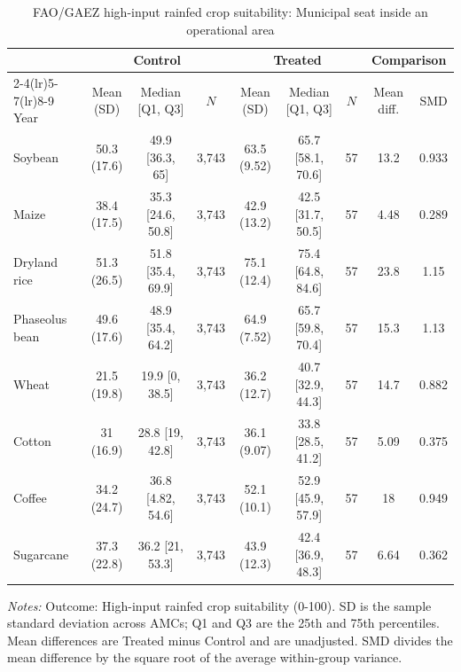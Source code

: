 \begin{table}[!htbp]
\centering
\caption{FAO/GAEZ high-input rainfed crop suitability: Municipal seat inside an operational area}
\label{tab:polocentro_operational_any_seat_inside_gaez_high_input}
\small
\setlength{\tabcolsep}{4pt}
\begin{tabular}{@{}lcccccccc@{}}
\toprule
& \multicolumn{3}{c}{Control} & \multicolumn{3}{c}{Treated} & \multicolumn{2}{c}{Comparison} \\
\cmidrule(lr){2-4}\cmidrule(lr){5-7}\cmidrule(lr){8-9}
Year & Mean (SD) & Median [Q1, Q3] & $N$ & Mean (SD) & Median [Q1, Q3] & $N$ & Mean diff. & SMD \\
\midrule
Soybean & 50.3 (17.6) & 49.9 [36.3, 65] & 3,743 & 63.5 (9.52) & 65.7 [58.1, 70.6] & 57 & 13.2 & 0.933 \\
Maize & 38.4 (17.5) & 35.3 [24.6, 50.8] & 3,743 & 42.9 (13.2) & 42.5 [31.7, 50.5] & 57 & 4.48 & 0.289 \\
Dryland rice & 51.3 (26.5) & 51.8 [35.4, 69.9] & 3,743 & 75.1 (12.4) & 75.4 [64.8, 84.6] & 57 & 23.8 & 1.15 \\
Phaseolus bean & 49.6 (17.6) & 48.9 [35.4, 64.2] & 3,743 & 64.9 (7.52) & 65.7 [59.8, 70.4] & 57 & 15.3 & 1.13 \\
Wheat & 21.5 (19.8) & 19.9 [0, 38.5] & 3,743 & 36.2 (12.7) & 40.7 [32.9, 44.3] & 57 & 14.7 & 0.882 \\
Cotton & 31 (16.9) & 28.8 [19, 42.8] & 3,743 & 36.1 (9.07) & 33.8 [28.5, 41.2] & 57 & 5.09 & 0.375 \\
Coffee & 34.2 (24.7) & 36.8 [4.82, 54.6] & 3,743 & 52.1 (10.1) & 52.9 [45.9, 57.9] & 57 & 18 & 0.949 \\
Sugarcane & 37.3 (22.8) & 36.2 [21, 53.3] & 3,743 & 43.9 (12.3) & 42.4 [36.9, 48.3] & 57 & 6.64 & 0.362 \\
\bottomrule
\end{tabular}
\vspace{2pt}
\begin{minipage}{0.98\linewidth}
\footnotesize \textit{Notes:} Outcome: High-input rainfed crop suitability (0-100). SD is the sample standard deviation across AMCs; Q1 and Q3 are the 25th and 75th percentiles. Mean differences are Treated minus Control and are unadjusted. SMD divides the mean difference by the square root of the average within-group variance.
\end{minipage}
\end{table}
